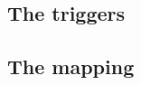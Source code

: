 
\subsection{The triggers} \label{sec:algorithm:triggering}

\subsection{The mapping} \label{sec:algorithm:mapping}
